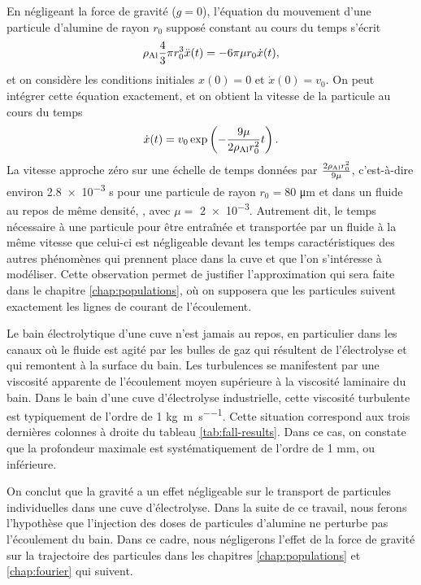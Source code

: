 \begin{remarque}
  En négligeant la force de gravité ($g = 0$), l'équation du mouvement
  d'une particule d'alumine de rayon $r_0$ supposé constant au cours
  du temps s'écrit
  \begin{equation*}
    \rho_\mathrm{Al} \frac{4}{3}\pi r_0^3 \ddot x(t) = -
    6\pi\mu r_0 \dot x(t),
  \end{equation*}
  et on considère les conditions initiales $x(0) = 0$ et $\dot x(0) =
  v_0$. On peut intégrer cette équation exactement, et on obtient la
  vitesse de la particule au cours du temps
  \begin{equation*}
    \dot x(t) = v_0\exp\left( -\frac{9\mu}{2\rho_\mathrm{Al} r_0^2}t \right).
  \end{equation*}
  La vitesse approche zéro sur une échelle de temps données par
  $\frac{2\rho_\mathrm{Al} r_0^2}{9\mu}$,
  c'est-à-dire environ \num{2.8e-3} \si{\second} pour une particule de
  rayon $r_0 = \num{80}$ \si{\micro\meter} et dans un fluide au repos
  de même densité, \ie, avec $\mu = $ \num{2e-3}. Autrement dit, le
  temps nécessaire à une particule pour être entraînée et transportée
  par un fluide à la même vitesse que celui-ci est négligeable devant
  les temps caractéristiques des autres phénomènes qui prennent place
  dans la cuve et que l'on s'intéresse à modéliser. Cette observation
  permet de justifier l'approximation qui sera faite dans le chapitre
  \ref{chap:populations}, où on supposera que les particules suivent
  exactement les lignes de courant de l'écoulement.
\end{remarque}

\begin{remarque}

  Le bain électrolytique d'une cuve n'est jamais au repos, en
  particulier dans les canaux où le fluide est agité par les bulles de
  gaz qui résultent de l'électrolyse et qui remontent à la surface du
  bain. Les turbulences se manifestent par une viscosité apparente de
  l'écoulement moyen supérieure à la viscosité laminaire du bain. Dans
  le bain d'une cuve d'électrolyse industrielle, cette viscosité
  turbulente est typiquement de l'ordre de \num{1}
  \si{\kilo\gram\per\meter\per\second}. Cette situation correspond aux
  trois dernières colonnes à droite du tableau
  \ref{tab:fall-results}. Dans ce cas, on constate que la profondeur
  maximale est systématiquement de l'ordre de
  \num{1} \si{\milli\meter}, ou inférieure.

  On conclut que la gravité a un effet négligeable sur le transport de
  particules individuelles dans une cuve d'électrolyse. Dans la suite
  de ce travail, nous ferons l'hypothèse que l'injection des doses de
  particules d'alumine ne perturbe pas l'écoulement du bain. Dans ce
  cadre, nous négligerons l'effet de la force de gravité sur la
  trajectoire des particules dans les chapitres \ref{chap:populations}
  et \ref{chap:fourier} qui suivent.
\end{remarque}
